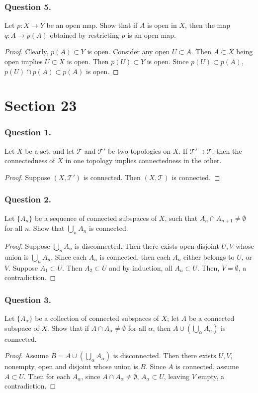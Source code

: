 \documentclass[12pt]{article}
\begin{document}
    
\subsubsection*{Question 5.} Let \( p: X \to Y \) be an open map. 
Show that if \( A \) is open in \( X \), then the map \( q: A \to p(A) \) obtained by restricting \( p \) is an open map.
\begin{proof}
    Clearly, $p(A) \subset Y$ is open. Consider any open $U \subset A$.
    Then $A \subset X$ being open implies $U \subset X$ is open.
    Then $p(U) \subset Y$ is open. Since $p(U) \subset p(A)$, $p(U) \cap p(A) \subset p(A)$
    is open.
\end{proof}
\section{Section 23}
\subsubsection*{Question 1.} Let \( X \) be a set, and let \( \mathcal{T} \) and \( \mathcal{T}' \) be two 
topologies on \( X \). If \( \mathcal{T}' \supset \mathcal{T} \), then the connectedness of \( X \) in one topology implies connectedness in the other.

\begin{proof}
    Suppose $(X, \mathcal{T'})$ is connected. Then $(X, \mathcal{T})$ is connected.
\end{proof}
\subsubsection*{Question 2.} Let \( \{ A_n \} \) be a sequence of connected subspaces 
of \( X \), such that \( A_n \cap A_{n+1} \neq \emptyset \) for all \( n \). Show that \( \bigcup_{n} A_n \) is connected.
\begin{proof}
    Suppose $\bigcup_n A_n$ is disconnected. Then there exists open disjoint 
    $U, V$ whose union is $\bigcup_n A_n$. Since each $A_n$ is connected, then
    each $A_n$ either belongs to $U$, or $V$. Suppose $A_1 \subset U$. Then $A_2 \subset U$
    and by induction, all $A_n \subset U$. Then, $V = \emptyset$, a contradiction.  
\end{proof}
\subsubsection*{Question 3.} Let \( \{ A_{\alpha} \} \) be a collection of connected 
subspaces of \( X \); let \( A \) be a connected subspace of \( X \). Show that if \( A \cap A_{\alpha} \neq \emptyset \) for all \( \alpha \), then \( A \cup \left( \bigcup_{\alpha} A_{\alpha} \right) \) is connected.
\begin{proof}
    Assume $B = A \cup (\bigcup_\alpha A_\alpha)$ is disconnected.
    Then there exists $U, V$, nonempty, open and disjoint whose union is $B$.
    Since $A$ is connected, assume $A \subset U$. Then for each $A_\alpha$, since $A 
    \cap A_\alpha \ne \emptyset$, $A_\alpha \subset U$, leaving $V$ empty, a contradiction.
\end{proof}
\end{document}
